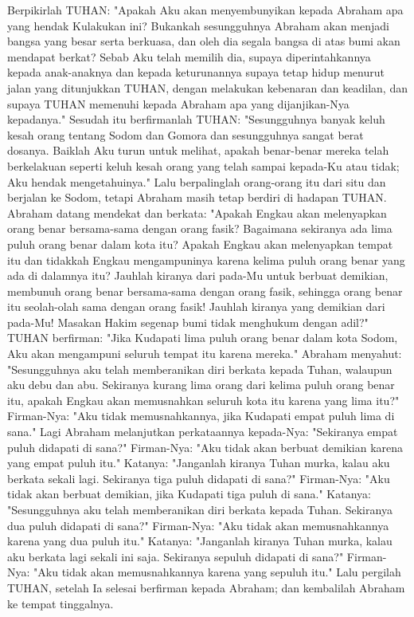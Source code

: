 \begin{biblechapter}
\verse Berpikirlah TUHAN: "Apakah Aku akan menyembunyikan kepada Abraham apa yang hendak Kulakukan ini?
\verse Bukankah sesungguhnya Abraham akan menjadi bangsa yang besar serta berkuasa, dan oleh dia segala bangsa di atas bumi akan mendapat berkat?
\verse Sebab Aku telah memilih dia, supaya diperintahkannya kepada anak-anaknya dan kepada keturunannya supaya tetap hidup menurut jalan yang ditunjukkan TUHAN, dengan melakukan kebenaran dan keadilan, dan supaya TUHAN memenuhi kepada Abraham apa yang dijanjikan-Nya kepadanya."
\verse Sesudah itu berfirmanlah TUHAN: "Sesungguhnya banyak keluh kesah orang tentang Sodom dan Gomora dan sesungguhnya sangat berat dosanya.
\verse Baiklah Aku turun untuk melihat, apakah benar-benar mereka telah berkelakuan seperti keluh kesah orang yang telah sampai kepada-Ku atau tidak; Aku hendak mengetahuinya."
\verse Lalu berpalinglah orang-orang itu dari situ dan berjalan ke Sodom, tetapi Abraham masih tetap berdiri di hadapan TUHAN.
\verse Abraham datang mendekat dan berkata: "Apakah Engkau akan melenyapkan orang benar bersama-sama dengan orang fasik?
\verse Bagaimana sekiranya ada lima puluh orang benar dalam kota itu? Apakah Engkau akan melenyapkan tempat itu dan tidakkah Engkau mengampuninya karena kelima puluh orang benar yang ada di dalamnya itu?
\verse Jauhlah kiranya dari pada-Mu untuk berbuat demikian, membunuh orang benar bersama-sama dengan orang fasik, sehingga orang benar itu seolah-olah sama dengan orang fasik! Jauhlah kiranya yang demikian dari pada-Mu! Masakan Hakim segenap bumi tidak menghukum dengan adil?"
\verse TUHAN berfirman: "Jika Kudapati lima puluh orang benar dalam kota Sodom, Aku akan mengampuni seluruh tempat itu karena mereka."
\verse Abraham menyahut: "Sesungguhnya aku telah memberanikan diri berkata kepada Tuhan, walaupun aku debu dan abu.
\verse Sekiranya kurang lima orang dari kelima puluh orang benar itu, apakah Engkau akan memusnahkan seluruh kota itu karena yang lima itu?" Firman-Nya: "Aku tidak memusnahkannya, jika Kudapati empat puluh lima di sana."
\verse Lagi Abraham melanjutkan perkataannya kepada-Nya: "Sekiranya empat puluh didapati di sana?" Firman-Nya: "Aku tidak akan berbuat demikian karena yang empat puluh itu."
\verse Katanya: "Janganlah kiranya Tuhan murka, kalau aku berkata sekali lagi. Sekiranya tiga puluh didapati di sana?" Firman-Nya: "Aku tidak akan berbuat demikian, jika Kudapati tiga puluh di sana."
\verse Katanya: "Sesungguhnya aku telah memberanikan diri berkata kepada Tuhan. Sekiranya dua puluh didapati di sana?" Firman-Nya: "Aku tidak akan memusnahkannya karena yang dua puluh itu."
\verse Katanya: "Janganlah kiranya Tuhan murka, kalau aku berkata lagi sekali ini saja. Sekiranya sepuluh didapati di sana?" Firman-Nya: "Aku tidak akan memusnahkannya karena yang sepuluh itu."
\verse Lalu pergilah TUHAN, setelah Ia selesai berfirman kepada Abraham; dan kembalilah Abraham ke tempat tinggalnya.
\end{biblechapter}

